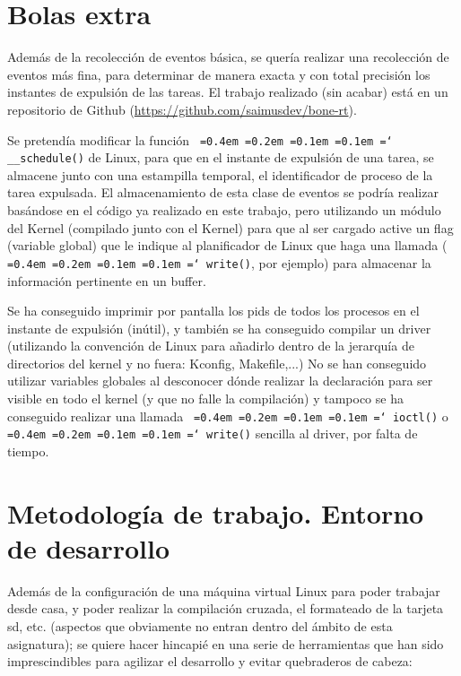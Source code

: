 \documentclass[11pt,spanish]{article}
\newcommand*\justify{%
  \fontdimen2\font=0.4em%
  \fontdimen3\font=0.2em%
  \fontdimen4\font=0.1em%
  \fontdimen7\font=0.1em%
  \hyphenchar\font=`\-%
}
\newcommand{\code}[1]{\texttt{\justify #1}}
\begin{document}
\section{Bolas extra}
Además de la recolección de eventos básica, se quería realizar una recolección
de eventos más fina, para determinar de manera exacta y con total precisión los instantes de 
expulsión de las tareas. El trabajo realizado (sin acabar) está en un repositorio de Github 
(\url{https://github.com/saimusdev/bone-rt}).

Se pretendía modificar la función \code{\_\_schedule()} de Linux, para que en el instante
de expulsión de una tarea, se almacene junto con una estampilla temporal, el identificador de
proceso de la tarea expulsada. El almacenamiento de esta clase de eventos se podría realizar 
basándose en el código ya realizado en este trabajo, pero utilizando un módulo del Kernel 
(compilado junto con el Kernel) para que al ser cargado active un flag (variable global) que 
le indique al planificador de Linux que haga una llamada (\code{write()}, por ejemplo) para 
almacenar la información pertinente en un buffer.

Se ha conseguido imprimir por pantalla los pids de todos los procesos en el instante de 
expulsión (inútil), y también se ha conseguido compilar un driver (utilizando la convención
de Linux para añadirlo dentro de la jerarquía de directorios del kernel y no fuera: Kconfig, Makefile,...)
No se han conseguido utilizar variables globales al desconocer dónde realizar la declaración
para ser visible en todo el kernel (y que no falle la compilación) y tampoco se ha conseguido 
realizar una llamada \code{ioctl()} o \code{write()} sencilla al driver, por falta de tiempo.

\section{Metodología de trabajo. Entorno de desarrollo}
Además de la configuración de una máquina virtual Linux para poder trabajar
desde casa, y poder realizar la compilación cruzada, el formateado de la tarjeta sd, etc.
(aspectos que obviamente no entran dentro del ámbito de esta asignatura); se quiere
hacer hincapié en una serie de herramientas que han sido imprescindibles para agilizar
el desarrollo y evitar quebraderos de cabeza:
\end{document}
